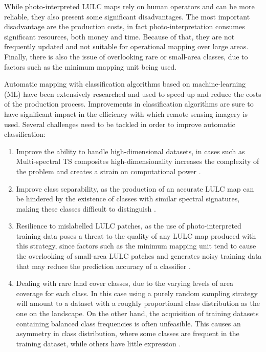 \documentclass[parskip=full]{scrartcl}
\begin{document}
While photo-interpreted LULC maps rely on human operators and can be more
reliable, they also present some significant disadvantages. The most important
disadvantage are the production costs, in fact photo-interpretation consumes
significant resources, both money and time. Because of that, they are not
frequently updated and not suitable for operational mapping over large areas.
Finally, there is also the issue of overlooking rare or small-area classes, due
to factors such as the minimum mapping unit being used.

Automatic mapping with classification algorithms based on machine-learning (ML)
have been extensively researched and used to speed up and reduce the costs of
the production process. Improvements in classification algorithms are sure to
have significant impact in the efficiency with which remote sensing imagery is
used. Several challenges need to be tackled in order to improve automatic
classification:

\begin{enumerate}
    \item Improve the ability to handle high-dimensional datasets, in cases such
        as Multi-spectral TS composites high-dimensionality increases the
        complexity of the problem and creates a strain on computational power
        \cite{Stromann2020}.
    \item Improve class separability, as the production of an accurate LULC map
        can be hindered by the existence of classes with similar spectral
        signatures, making these classes difficult to distinguish
        \cite{Alonso-Sarria2019}.
    \item Resilience to mislabelled LULC patches, as the use of
        photo-interpreted training data poses a threat to the quality of any
        LULC map produced with this strategy, since factors such as the minimum
        mapping unit tend to cause the overlooking of small-area LULC patches
        and generates noisy training data that may reduce the prediction
        accuracy of a classifier \cite{Pelletier2017}.
	\item Dealing with rare land cover classes, due to the varying levels of
	      area coverage for each class. In this case using a purely random sampling strategy
	      will amount to a dataset with a roughly proportional class
	      distribution as the one on the landscape. On the other hand, the
	      acquisition of training datasets containing balanced class frequencies
	      is often unfeasible. This causes an asymmetry in class distribution,
	      where some classes are frequent in the training dataset, while others
	      have little expression \cite{Wang2019, Feng2019}.
\end{enumerate}
\end{document}
